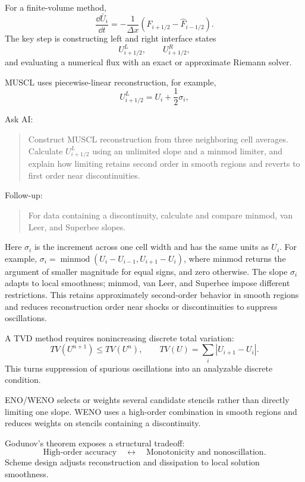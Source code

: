 For a finite-volume method,
\[
\frac{\dd \bar U_i}{\dd t}
=
-\frac{1}{\Delta x}
\left(
\widehat F_{i+1/2}
-
\widehat F_{i-1/2}
\right).
\]
The key step is constructing left and right interface states
\[
U_{i+1/2}^{L},
\qquad
U_{i+1/2}^{R},
\]
and evaluating a numerical flux with an exact or approximate Riemann solver.

MUSCL uses piecewise-linear reconstruction, for example,
\[
U_{i+1/2}^{L}
=
U_i+\frac12\sigma_i,
\]

\begin{askai}
Ask AI:
\begin{quote}
Construct MUSCL reconstruction from three neighboring cell averages. Calculate \(U_{i+1/2}^L\) using an unlimited slope and a minmod limiter, and explain how limiting retains second order in smooth regions and reverts to first order near discontinuities.
\end{quote}

Follow-up:
\begin{quote}
For data containing a discontinuity, calculate and compare minmod, van Leer, and Superbee slopes.
\end{quote}
\end{askai}

Here $\sigma_i$ is the increment across one cell width and has the same units as $U_i$.
For example, $\sigma_i=\operatorname{minmod}(U_i-U_{i-1},U_{i+1}-U_i)$,
where minmod returns the argument of smaller magnitude for equal signs, and zero otherwise.
The slope \(\sigma_i\) adapts to local smoothness; minmod, van Leer, and Superbee impose different restrictions. This retains approximately second-order behavior in smooth regions and reduces reconstruction order near shocks or discontinuities to suppress oscillations.

A TVD method requires nonincreasing discrete total variation:
\[
TV(U^{n+1})\le TV(U^n),
\qquad
TV(U)=\sum_i|U_{i+1}-U_i|.
\]
This turns suppression of spurious oscillations into an analyzable discrete condition.

ENO/WENO selects or weights several candidate stencils rather than directly limiting one slope. WENO uses a high-order combination in smooth regions and reduces weights on stencils containing a discontinuity.

Godunov's theorem exposes a structural tradeoff:
\[
\text{High-order accuracy}
\quad\leftrightarrow\quad
\text{Monotonicity and nonoscillation}.
\]
Scheme design adjusts reconstruction and dissipation to local solution smoothness.

